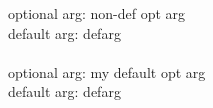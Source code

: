 \documentclass{article}
\begin{document}
\vspace*{\fill}\vspace{-5ex}
\newcommand{\testOpt}[2][my default opt arg]{
optional arg: #1\\
default arg: #2\\
}

\testOpt[non-def opt arg]{defarg}\\
\testOpt{defarg}
\vspace*{\fill}
\end{document}
